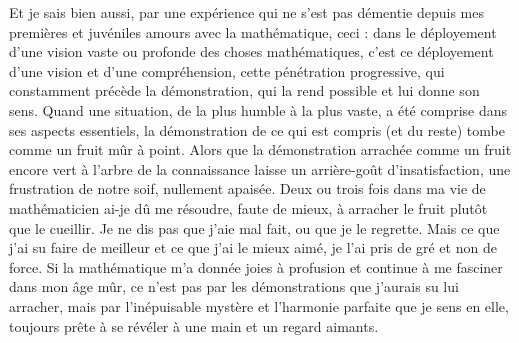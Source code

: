 Et je sais bien aussi, par une expérience qui ne s'est pas démentie depuis mes premières et juvéniles amours avec la mathématique, ceci : dans le déployement d'une vision vaste ou profonde des choses mathématiques, c'est ce déployement d'une vision et d'une compréhension, cette pénétration progressive, qui constamment précède la démonstration, qui la rend possible et lui donne son sens. Quand une situation, de la plus humble à la plus vaste, a été comprise dans ses aspects essentiels, la démonstration de ce qui est compris (et du reste) tombe comme un fruit mûr à point. Alors que la démonstration arrachée comme un fruit encore vert à l'arbre de la connaissance laisse un arrière-goût d'insatisfaction, une frustration de notre soif, nullement apaisée. Deux ou trois fois dans ma vie de mathématicien ai-je dû me résoudre, faute de mieux, à arracher le fruit plutôt que le cueillir. Je ne dis pas que j'aie mal fait, ou que je le regrette. Mais ce que j'ai su faire de meilleur et ce que j'ai le mieux aimé, je l'ai pris de gré et non de force. Si la mathématique m'a donnée joies à profusion et continue à me fasciner dans mon âge mûr, ce n'est pas par les démonstrations que j'aurais su lui arracher, mais par l'inépuisable mystère et l'harmonie parfaite que je sens en elle, toujours prête à se révéler à une main et un regard aimants.
